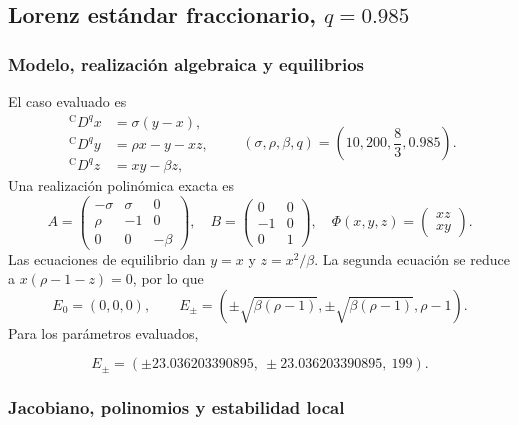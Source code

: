 \subsection{Lorenz estándar fraccionario, \texorpdfstring{\(q=0.985\)}{q=0.985}}

\subsubsection*{Modelo, realización algebraica y equilibrios}

El caso evaluado es
\begin{equation}
\begin{aligned}
 {}^{\mathrm C}D^q x&=\sigma(y-x),\\
 {}^{\mathrm C}D^q y&=\rho x-y-xz,\\
 {}^{\mathrm C}D^q z&=xy-\beta z,
\end{aligned}
\qquad
(\sigma,\rho,\beta,q)=\left(10,200,\frac83,0.985\right).
\label{ncbench:eq:lorenz-standard}
\end{equation}
Una realización polinómica exacta es
\begin{equation}
 A=\begin{pmatrix}-\sigma&\sigma&0\\ \rho&-1&0\\0&0&-\beta\end{pmatrix},
 \quad
 B=\begin{pmatrix}0&0\\-1&0\\0&1\end{pmatrix},
 \quad
 \Phi(x,y,z)=\begin{pmatrix}xz\\xy\end{pmatrix}.
\end{equation}
Las ecuaciones de equilibrio dan \(y=x\) y \(z=x^2/\beta\). La segunda
ecuación se reduce a \(x(\rho-1-z)=0\), por lo que
\begin{equation}
 E_0=(0,0,0),\qquad
 E_{\pm}=\left(\pm\sqrt{\beta(\rho-1)},
 \pm\sqrt{\beta(\rho-1)},\rho-1\right).
\end{equation}
Para los parámetros evaluados,

\[
 E_{\pm}=(\pm23.036203390895,\ \pm23.036203390895,\ 199).
\]

\subsubsection*{Jacobiano, polinomios y estabilidad local}

